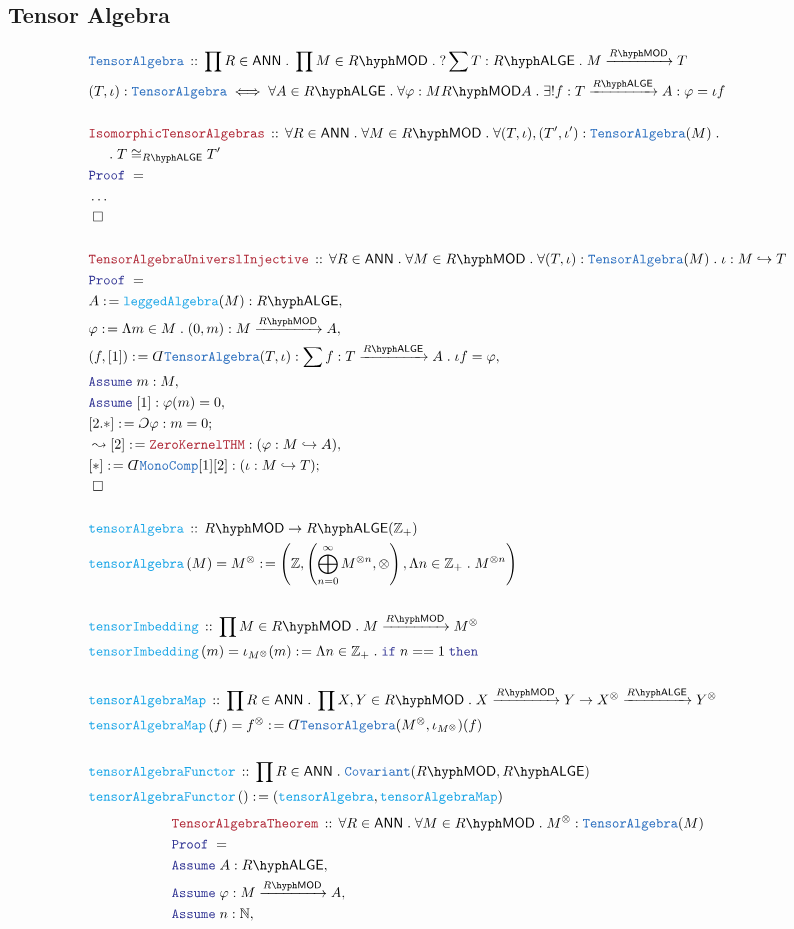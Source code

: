 \documentclass[12pt]{scrartcl}%
\newcommand{\TYPE}[1]{\textcolor{NavyBlue}{\mathtt{#1}}}%
\newcommand{\FUNC}[1]{\textcolor{Cerulean}{\mathtt{#1}}}%
\newcommand{\LOGIC}[1]{\textcolor{Blue}{\mathtt{#1}}}%
\newcommand{\THM}[1]{\textcolor{Maroon}{\mathtt{#1}}}%
\renewcommand{\.}{\; . \;} %
\newcommand{\de}{: \kern 0.1pc =} %
\newcommand{\If}{\LOGIC{if} \;} %
\newcommand{\Then}{ \; \LOGIC{then} \;} %
\newcommand{\Act}[1]{\left( #1 \right)} %
\newcommand{\Theorem}[2]{& \THM{#1} \, :: \, #2 \\ & \Proof = \\ } %
\newcommand{\DeclareType}[2]{& \TYPE{#1} \, :: \, #2 \\}%
\newcommand{\DefineType}[3]{& #1 : \TYPE{#2} \iff #3 \\}%
\newcommand{\DeclareFunc}[2]{& \FUNC{#1} \, :: \, #2 \\}%
\newcommand{\DefineFunc}[3]{&  \FUNC{#1}\Act{#2} \de #3 \\}%
\newcommand{\DefineNamedFunc}[4]{&  \FUNC{#1}\Act{#2} = #3 \de #4 \\}%
\newcommand{\NewLine}{\\ & \kern 1pc}%
\newcommand{\Page}[1]{ \begin{align*} #1 \end{align*}  }%
\newcommand{ \bd }{ \ByDef }%
\newcommand{\NoProof}{ & \ldots \\ \EndProof}%
\newcommand{\Int}{\mathbb{Z}}%
\newcommand{\Nat}{\mathbb{N}}%
\newcommand{\ToInj}{\hookrightarrow} %
\newcommand{\Say}[3]{& #1 \de #2 : #3, \\} %
\newcommand{\Conclude}[3]{& #1 \de #2 : #3; \\}%
\newcommand{\Derive}[3]{& \leadsto #1 \de #2 : #3, \\} %
\newcommand{\Assume}[2]{& \LOGIC{Assume} \; #1 : #2, \\} %
\newcommand{\QED}{\; \square} %
\newcommand{\EndProof}{& \QED \\} %
\newcommand{\ByDef}{\rotatebox[origin=c]{-180}{$D$}}%
\newcommand{\ByConstr}{\rotatebox[origin=c]{-180}{$C$}}%
\newcommand{\Proof}{\LOGIC{Proof} \; } %
\newcommand{\Arrow}[1]{\xrightarrow{#1}}%
\newcommand{\Cov}{\TYPE{Covariant}}%
\newcommand{\LMOD}[1]{#1\hyph\mathsf{MOD}} %
\newcommand{\ANN}{\mathsf{ANN}} %
\newcommand{\LALGE}[1]{#1\hyph\mathsf{ALGE}}%
\begin{document}
\subsection{Tensor Algebra}
\Page{
	\DeclareType{TensorAlgebra}{\prod R \in \ANN \. \prod M \in \LMOD{R} \. ?\sum T : \LALGE{R} \.  M  \Arrow{\LMOD{R}} T }
	\DefineType{(T,\iota)}{TensorAlgebra}{\forall A \in \LALGE{R} \. \forall \varphi : M \LMOD{R} A \. \exists! f : T \Arrow{\LALGE{R}} A : \varphi = \iota f  }
	\\
	\Theorem{IsomorphicTensorAlgebras}{\forall R \in \ANN \. \forall M \in \LMOD{R} \.  \forall (T,\iota),(T',\iota') : \TYPE{TensorAlgebra}(M) \. 
		\NewLine \. T \cong_{\LALGE{R}} T'}
	\NoProof
	\\
	\Theorem{TensorAlgebraUniverslInjective}{\forall R \in \ANN \. \forall M \in \LMOD{R} \. \forall (T,\iota) : \TYPE{TensorAlgebra}(M) \. \iota : M \ToInj T }
	\Say{A}{\FUNC{leggedAlgebra}(M)}{\LALGE{R}}
	\Say{\varphi}{\Lambda m \in M \. (0,m)}{M \Arrow{\LMOD{R}} A}
	\Say{(f,[1])}{\bd \TYPE{TensorAlgebra}(T,\iota)}{\sum f : T \Arrow{\LALGE{R}} A \. \iota f = \varphi}
	\Assume{m}{M}
	\Assume{[1]}{\varphi(m) = 0}
	\Conclude{[2.*]}{\ByConstr \varphi}{m = 0}
	\Derive{[2]}{\THM{ZeroKernelTHM}}{(\varphi : M \ToInj A)}
	\Conclude{[*]}{\bd \TYPE{MonoComp}[1][2]}{(\iota : M \ToInj T)}
	\EndProof
	\\
	\DeclareFunc{tensorAlgebra}{\LMOD{R} \to \LALGE{R}(\Int_+)}
	\DefineNamedFunc{tensorAlgebra}{M}{M^{\otimes}}{\left( \Int, \left(\bigoplus_{n=0}^\infty M^{\otimes n},\otimes \right),\Lambda n \in \Int_+ \. M^{\otimes n}\right) } 
	\\
	\DeclareFunc{tensorImbedding}{ \prod M \in \LMOD{R} \. M \Arrow{\LMOD{R}} M^\otimes}
	\DefineNamedFunc{tensorImbedding}{m}{\iota_{M^\otimes}(m)}{\Lambda n \in \Int_+ \.  \If n == 1 \Then}
	\\
	\DeclareFunc{tensorAlgebraMap}{\prod R \in \ANN \. \prod X,Y \in \LMOD{R} \.  X \Arrow{\LMOD{R}} Y \to  X^\otimes \Arrow{\LALGE{R}} Y^\otimes }
	\DefineNamedFunc{tensorAlgebraMap}{f}{f^\otimes}{\bd \TYPE{TensorAlgebra}(M^\otimes,\iota_{M^\otimes})(f)  }                                
	\\
	\DeclareFunc{tensorAlgebraFunctor}{\prod R \in \ANN \. \Cov(\LMOD{R},\LALGE{R})}
	\DefineFunc{tensorAlgebraFunctor}{}{ (\FUNC{tensorAlgebra}, \FUNC{tensorAlgebraMap}) }
}\Page{
	\Theorem{TensorAlgebraTheorem}{\forall R \in \ANN \. \forall M \in \LMOD{R} \.  M^\otimes : \TYPE{TensorAlgebra}(M)}
	\Assume{A}{\LALGE{R}}
	\Assume{\varphi}{M \Arrow{\LMOD{R}} A}
	\Assume{n}{\Nat}
}
\end{document}

